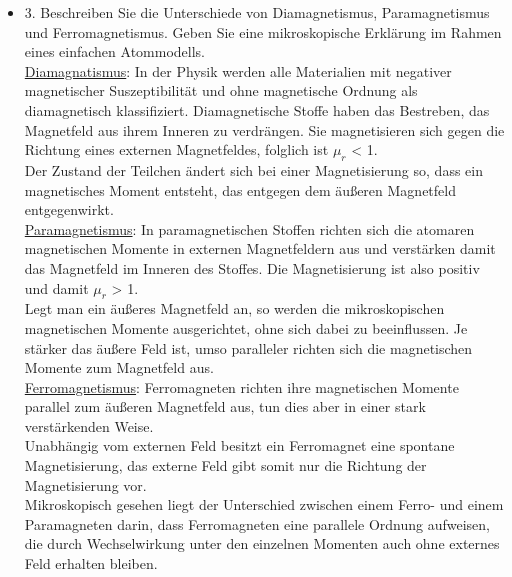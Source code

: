 \begin{itemize}
\item 3. Beschreiben Sie die Unterschiede von Diamagnetismus, Paramagnetismus und Ferromagnetismus.
Geben Sie eine mikroskopische Erklärung im Rahmen eines einfachen Atommodells.\\
\underline{Diamagnatismus}: In der Physik werden alle Materialien mit negativer magnetischer Suszeptibilität und ohne magnetische Ordnung als diamagnetisch klassifiziert.
 Diamagnetische Stoffe haben das Bestreben, das Magnetfeld aus ihrem Inneren zu verdrängen. Sie magnetisieren sich gegen die Richtung eines externen Magnetfeldes, folglich ist $\mu_r$ < 1.  \\
 Der Zustand der Teilchen ändert sich bei einer Magnetisierung so, dass ein magnetisches Moment entsteht, das entgegen dem äußeren Magnetfeld entgegenwirkt.\\
\underline{Paramagnetismus}:  In paramagnetischen Stoffen richten sich die atomaren magnetischen Momente in externen Magnetfeldern aus und verstärken damit das Magnetfeld im Inneren des Stoffes. Die Magnetisierung ist also positiv und damit $\mu_r$ > 1.\\
Legt man ein äußeres Magnetfeld an, so werden die mikroskopischen magnetischen Momente ausgerichtet, ohne sich dabei zu beeinflussen. Je stärker das äußere Feld ist, umso paralleler richten sich die magnetischen Momente zum Magnetfeld aus.\\
\underline{Ferromagnetismus}: Ferromagneten richten ihre magnetischen Momente parallel zum äußeren Magnetfeld aus, tun dies aber in einer stark verstärkenden Weise. \\
Unabhängig vom externen Feld besitzt ein Ferromagnet eine spontane Magnetisierung, das externe Feld gibt somit nur die Richtung der Magnetisierung vor.\\
Mikroskopisch gesehen liegt der Unterschied zwischen einem Ferro- und einem Paramagneten darin, dass Ferromagneten eine parallele Ordnung aufweisen, die durch Wechselwirkung unter den einzelnen Momenten auch ohne externes Feld erhalten bleiben.



\end{itemize}

